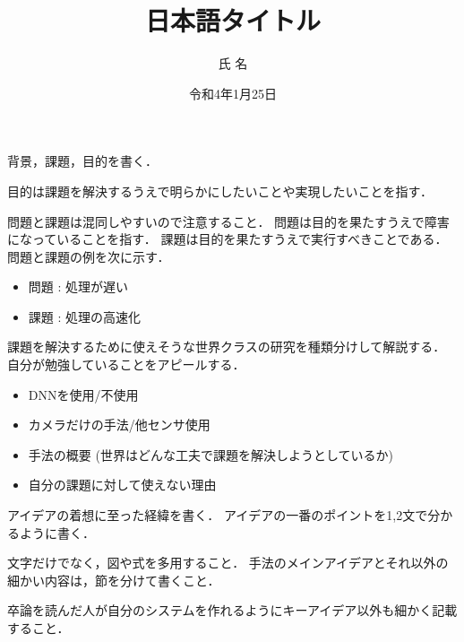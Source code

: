 \documentclass[a4j,titlepage,11pt]{jarticle}
\title{日本語タイトル} %
\author{氏 名} %
\date{令和4年1月25日} %
\begin{document}
\maketitle



\TableOfContents

背景，課題，目的を書く．

目的は課題を解決するうえで明らかにしたいことや実現したいことを指す．

問題と課題は混同しやすいので注意すること．
問題は目的を果たすうえで障害になっていることを指す．
課題は目的を果たすうえで実行すべきことである．
問題と課題の例を次に示す．
\begin{itemize}
  \item 問題 : 処理が遅い
  \item 課題 : 処理の高速化
\end{itemize}

課題を解決するために使えそうな世界クラスの研究を種類分けして解説する．
自分が勉強していることをアピールする．


\begin{itemize}
  \item DNNを使用/不使用
  \item カメラだけの手法/他センサ使用
\end{itemize}


\begin{itemize}
  \item 手法の概要 (世界はどんな工夫で課題を解決しようとしているか)
  \item 自分の課題に対して使えない理由
\end{itemize}


アイデアの着想に至った経緯を書く．
アイデアの一番のポイントを1,2文で分かるように書く．

文字だけでなく，図や式を多用すること．
手法のメインアイデアとそれ以外の細かい内容は，節を分けて書くこと．

卒論を読んだ人が自分のシステムを作れるようにキーアイデア以外も細かく記載すること．
\end{document}
